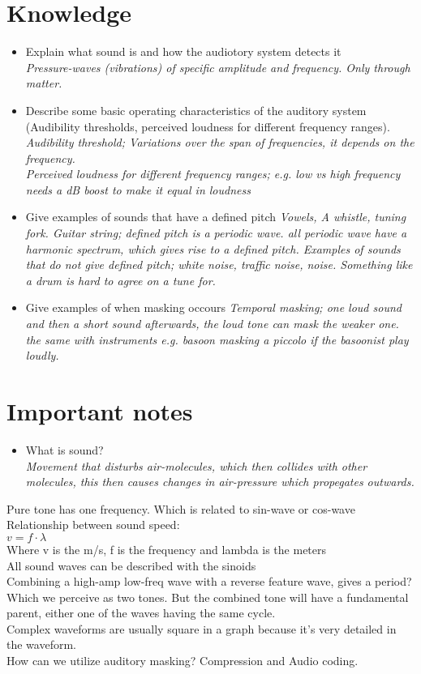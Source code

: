 \documentclass{article}
\begin{document}
\section{Knowledge}
\begin{itemize}
  \item Explain what sound is and how the audiotory system detects it\\
    \textit{Pressure-waves (vibrations) of specific amplitude and frequency. Only through matter. }
  \item Describe some basic operating characteristics of the auditory system (Audibility thresholds, perceived loudness for different frequency ranges).
    \textit{Audibility threshold; Variations over the span of frequencies, it depends on the frequency.\\Perceived loudness for different frequency ranges; e.g. low vs high frequency needs a dB boost to make it equal in loudness}
  \item Give examples of sounds that have a defined pitch
    \textit{Vowels, A whistle, tuning fork. Guitar string; defined pitch is a periodic wave. all periodic wave have a harmonic spectrum, which gives rise to a defined pitch. Examples of sounds that do not give defined pitch; white noise, traffic noise, noise. Something like a drum is hard to agree on a tune for.}
  \item Give examples of when masking occours
    \textit{Temporal masking; one loud sound and then a short sound afterwards, the loud tone can mask the weaker one.\\the same with instruments e.g. basoon masking a piccolo if the basoonist play loudly.}
\end{itemize}

\section{Important notes}
\begin{itemize}
  \item What is sound?\\
    \textit{Movement that disturbs air-molecules, which then collides with other molecules, this then causes changes in air-pressure which propegates outwards.}
\end{itemize}
Pure tone has one frequency. Which is related to sin-wave or cos-wave\\
Relationship between sound speed:\\
$ v = f\cdot\lambda$\\
Where v is the m/s, f is the frequency and lambda is the meters\\
All sound waves can be described with the sinoids\\
Combining a high-amp low-freq wave with a reverse feature wave, gives a period? Which we perceive as two tones. But the combined tone will have a fundamental parent, either one of the waves having the same cycle.\\
Complex waveforms are usually square in a graph because it's very detailed in the waveform.\\
How can we utilize auditory masking? Compression and Audio coding.
\end{document}
